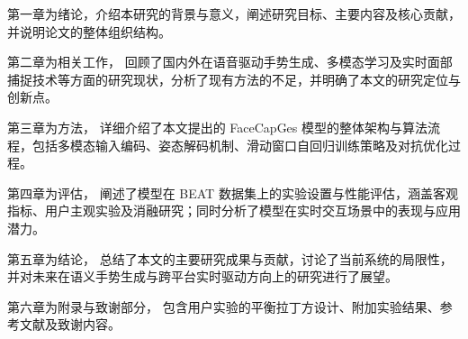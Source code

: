 第一章为绪论，介绍本研究的背景与意义，阐述研究目标、主要内容及核心贡献，并说明论文的整体组织结构。

第二章为相关工作， 回顾了国内外在语音驱动手势生成、多模态学习及实时面部捕捉技术等方面的研究现状，分析了现有方法的不足，并明确了本文的研究定位与创新点。

第三章为方法， 详细介绍了本文提出的 FaceCapGes 模型的整体架构与算法流程，包括多模态输入编码、姿态解码机制、滑动窗口自回归训练策略及对抗优化过程。

第四章为评估， 阐述了模型在 BEAT 数据集上的实验设置与性能评估，涵盖客观指标、用户主观实验及消融研究；同时分析了模型在实时交互场景中的表现与应用潜力。

第五章为结论， 总结了本文的主要研究成果与贡献，讨论了当前系统的局限性，并对未来在语义手势生成与跨平台实时驱动方向上的研究进行了展望。

第六章为附录与致谢部分， 包含用户实验的平衡拉丁方设计、附加实验结果、参考文献及致谢内容。




